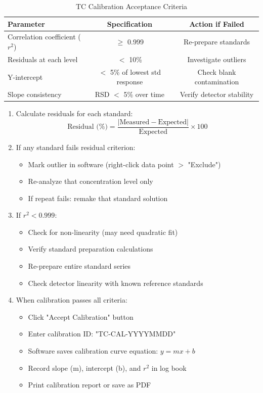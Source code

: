 \documentclass[11pt,a4paper]{article}\usepackage[]{graphicx}\usepackage[]{xcolor}
\begin{document}
\begin{table}[h]
\centering
\begin{tabular}{lcc}
\toprule
\textbf{Parameter} & \textbf{Specification} & \textbf{Action if Failed} \\
\midrule
Correlation coefficient ($r^2$) & $\geq$ 0.999 & Re-prepare standards \\
Residuals at each level & $<$ 10\% & Investigate outliers \\
Y-intercept & $<$ 5\% of lowest std response & Check blank contamination \\
Slope consistency & RSD $<$ 5\% over time & Verify detector stability \\
\bottomrule
\end{tabular}
\caption{TC Calibration Acceptance Criteria}
\end{table}

\begin{enumerate}[noitemsep]
    \item Calculate residuals for each standard:
    \begin{equation}
    \text{Residual (\%)} = \frac{|\text{Measured} - \text{Expected}|}{\text{Expected}} \times 100
    \end{equation}
    \item If any standard fails residual criterion:
    \begin{itemize}
        \item Mark outlier in software (right-click data point $>$ "Exclude")
        \item Re-analyze that concentration level only
        \item If repeat fails: remake that standard solution
    \end{itemize}
    \item If $r^2 < 0.999$:
    \begin{itemize}
        \item Check for non-linearity (may need quadratic fit)
        \item Verify standard preparation calculations
        \item Re-prepare entire standard series
        \item Check detector linearity with known reference standards
    \end{itemize}
    \item When calibration passes all criteria:
    \begin{itemize}
        \item Click "Accept Calibration" button
        \item Enter calibration ID: "TC-CAL-YYYYMMDD"
        \item Software saves calibration curve equation: $y = mx + b$
        \item Record slope (m), intercept (b), and $r^2$ in log book
        \item Print calibration report or save as PDF
    \end{itemize}
\end{enumerate}
\end{document}
